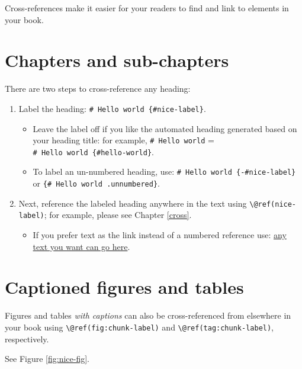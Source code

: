 \documentclass[
]{book}
\providecommand{\tightlist}{%
  \setlength{\itemsep}{0pt}\setlength{\parskip}{0pt}}
\theoremstyle{definition}
\theoremstyle{definition}
\theoremstyle{definition}
\theoremstyle{definition}
\theoremstyle{remark}
\begin{document}
Cross-references make it easier for your readers to find and link to elements in your book.

\hypertarget{chapters-and-sub-chapters}{%
\section{Chapters and sub-chapters}\label{chapters-and-sub-chapters}}

There are two steps to cross-reference any heading:

\begin{enumerate}
\def\labelenumi{\arabic{enumi}.}
\tightlist
\item
  Label the heading: \texttt{\#\ Hello\ world\ \{\#nice-label\}}.

  \begin{itemize}
  \tightlist
  \item
    Leave the label off if you like the automated heading generated based on your heading title: for example, \texttt{\#\ Hello\ world} = \texttt{\#\ Hello\ world\ \{\#hello-world\}}.
  \item
    To label an un-numbered heading, use: \texttt{\#\ Hello\ world\ \{-\#nice-label\}} or \texttt{\{\#\ Hello\ world\ .unnumbered\}}.
  \end{itemize}
\item
  Next, reference the labeled heading anywhere in the text using \texttt{\textbackslash{}@ref(nice-label)}; for example, please see Chapter \ref{cross}.

  \begin{itemize}
  \tightlist
  \item
    If you prefer text as the link instead of a numbered reference use: \protect\hyperlink{cross}{any text you want can go here}.
  \end{itemize}
\end{enumerate}

\hypertarget{captioned-figures-and-tables}{%
\section{Captioned figures and tables}\label{captioned-figures-and-tables}}

Figures and tables \emph{with captions} can also be cross-referenced from elsewhere in your book using \texttt{\textbackslash{}@ref(fig:chunk-label)} and \texttt{\textbackslash{}@ref(tag:chunk-label)}, respectively.

See Figure \ref{fig:nice-fig}.
\end{document}
